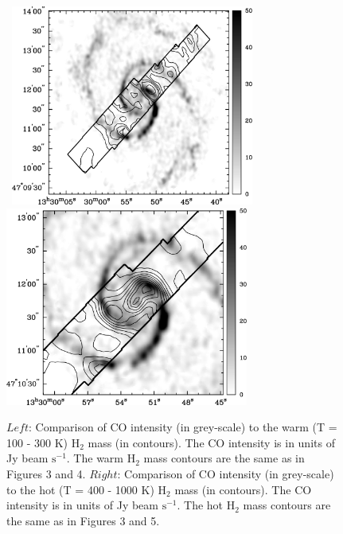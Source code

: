 \documentclass[manuscript]{aastex}
\begin{document}
\begin{figure}[!h]
\centerline{\hbox{\hspace{0.0in}
\includegraphics[width=8cm,angle=0]{bw_co_v_warm.jpg}
\hspace{0.1in}
\includegraphics[width=8cm,angle=0]{bw_co_v_hot.jpg}}}
\caption{$Left$: Comparison of  CO intensity (in grey-scale) to the warm (T = 100 - 300 K) $\mathrm{H_2}$ mass (in contours).  The CO intensity is in units of Jy beam $\mathrm{s^{-1}}$. The warm $\mathrm{H_2}$ mass contours are the same as in Figures 3 and 4.  $Right$: Comparison of CO intensity (in grey-scale) to the hot (T = 400 - 1000 K) $\mathrm{H_2}$ mass (in contours).  The CO intensity is in units of Jy beam $\mathrm{s^{-1}}$. The hot $\mathrm{H_2}$ mass contours are the same as in Figures 3 and 5.\label{fig7}}
\end{figure}

\clearpage
\end{document}
